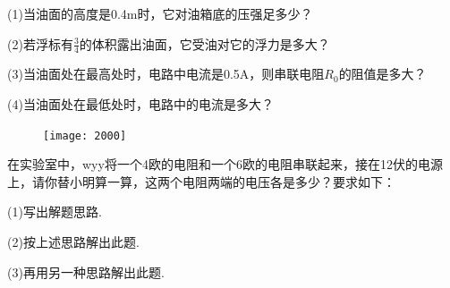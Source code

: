 \documentclass[11pt,a4paper]{article}
\newcommand{\nianfen}[1]{\hspace{-2em}{(#1\textbf{·}\textit{青岛})}}
\begin{document}
	(1)当油面的高度是0.4m时，它对油箱底的压强足多少？
	
	(2)若浮标有$\frac{3}{4}$的体积露出油面，它受油对它的浮力是多大？
	
	(3)当油面处在最高处时，电路中电流是0.5A，则串联电阻$ R_0 $的阻值是多大？
	
	(4)当油面处在最低处时，电路中的电流是多大？
	
	\rule{0em}{15em}
	
	\begin{figure}
		\texttt{[image: 2000]}
	\end{figure}
	\nianfen{2000}在实验室中，wyy将一个4欧的电阻和一个6欧的电阻串联起来，接在12伏的电源上，请你替小明算一算，这两个电阻两端的电压各是多少？要求如下：
	
	(1)写出解题思路.
	
	(2)按上述思路解出此题.
	
	(3)再用另一种思路解出此题.
\end{document}
